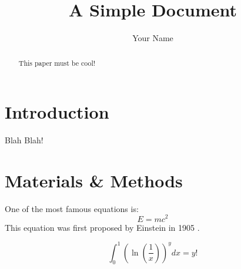 \documentclass[12pt]{article}
\title{A Simple Document}
\author{Your Name}
\date{}
\begin{document}
  \maketitle

  \begin{abstract}
    This paper must be cool!
  \end{abstract}

  \section{Introduction}
    Blah Blah!

  \section{Materials \& Methods}
  One of the most famous equations is:
  \begin{equation}
    E = mc^2
  \end{equation}
  This equation was first proposed by Einstein in 1905 
  \cite{einstein1905does}.

  
  

\begin{equation}
    \int_0^1 \left(\ln \left( \frac{1}{x} \right) 
    \right)^y dx = y!
\end{equation}
\end{document}
